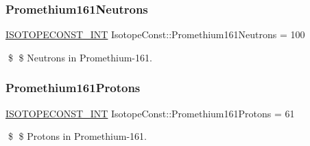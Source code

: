 \subsubsection{\texorpdfstring{Promethium161\+Neutrons}{Promethium161Neutrons}}
{\footnotesize\ttfamily \mbox{\hyperlink{group___isotope_const-_macros_ga5f18360b3e99483a35c32d789e62621c}{I\+S\+O\+T\+O\+P\+E\+C\+O\+N\+S\+T\+\_\+\+I\+NT}} Isotope\+Const\+::\+Promethium161\+Neutrons = 100}

\$ \$ Neutrons in Promethium-\/161. \mbox{\label{group___isotope_const-_promethium-_pm161_ga597c4548b1471aebf5312abc06bc8f1a}} 
\subsubsection{\texorpdfstring{Promethium161\+Protons}{Promethium161Protons}}
{\footnotesize\ttfamily \mbox{\hyperlink{group___isotope_const-_macros_ga5f18360b3e99483a35c32d789e62621c}{I\+S\+O\+T\+O\+P\+E\+C\+O\+N\+S\+T\+\_\+\+I\+NT}} Isotope\+Const\+::\+Promethium161\+Protons = 61}

\$ \$ Protons in Promethium-\/161. 